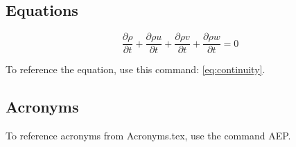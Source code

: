 \subsection{Equations}

\begin{equation} \label{eq:continuity}
 \frac{\partial \rho}{\partial t}
 + \frac{\partial \rho u}{\partial t}
 + \frac{\partial \rho v}{\partial t}
 + \frac{\partial \rho w}{\partial t}
 = 0
\end{equation}

To reference the equation, use this command: \ref{eq:continuity}.

\subsection{Acronyms}

To reference acronyms from Acronyms.tex, use the command \ac{AEP}.
